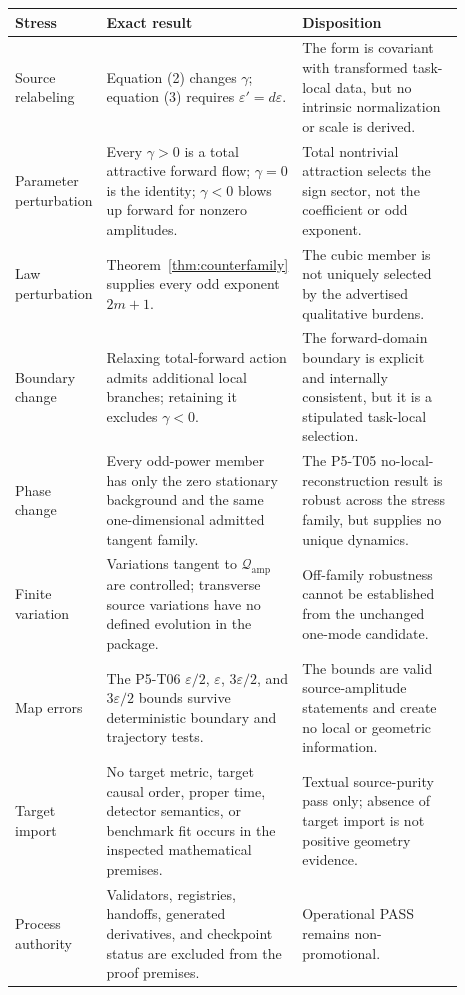 \documentclass[11pt]{article}
\newcommand{\Qamp}{\mathcal Q_{\mathrm{amp}}}
\begin{document}
\begin{center}
\begin{tabular}{p{0.18\linewidth}p{0.35\linewidth}p{0.36\linewidth}}
\hline
Stress & Exact result & Disposition\\
\hline
Source relabeling &
Equation (2) changes \(\gamma\); equation (3) requires
\(\varepsilon'=d\varepsilon\). &
The form is covariant with transformed task-local data, but no intrinsic
normalization or scale is derived.\\
Parameter perturbation &
Every \(\gamma>0\) is a total attractive forward flow; \(\gamma=0\) is the
identity; \(\gamma<0\) blows up forward for nonzero amplitudes. &
Total nontrivial attraction selects the sign sector, not the coefficient or
odd exponent.\\
Law perturbation &
Theorem~\ref{thm:counterfamily} supplies every odd exponent \(2m+1\). &
The cubic member is not uniquely selected by the advertised qualitative
burdens.\\
Boundary change &
Relaxing total-forward action admits additional local branches; retaining it
excludes \(\gamma<0\). &
The forward-domain boundary is explicit and internally consistent, but it is
a stipulated task-local selection.\\
Phase change &
Every odd-power member has only the zero stationary background and the same
one-dimensional admitted tangent family. &
The P5-T05 no-local-reconstruction result is robust across the stress family,
but supplies no unique dynamics.\\
Finite variation &
Variations tangent to \(\Qamp\) are controlled; transverse source
variations have no defined evolution in the package. &
Off-family robustness cannot be established from the unchanged one-mode
candidate.\\
Map errors &
The P5-T06 \(\varepsilon/2\), \(\varepsilon\),
\(3\varepsilon/2\), and \(3\varepsilon/2\) bounds survive deterministic
boundary and trajectory tests. &
The bounds are valid source-amplitude statements and create no local or
geometric information.\\
Target import &
No target metric, target causal order, proper time, detector semantics, or
benchmark fit occurs in the inspected mathematical premises. &
Textual source-purity pass only; absence of target import is not positive
geometry evidence.\\
Process authority &
Validators, registries, handoffs, generated derivatives, and checkpoint
status are excluded from the proof premises. &
Operational PASS remains non-promotional.\\
\hline
\end{tabular}
\end{center}
\end{document}
